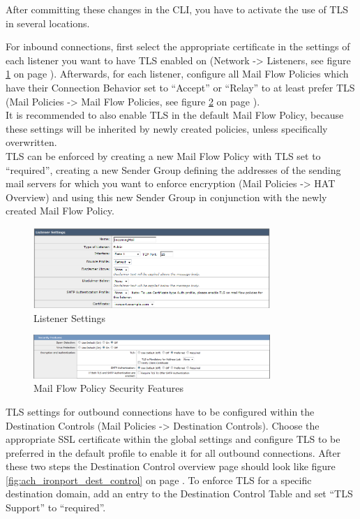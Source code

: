 After committing these changes in the CLI, you have to activate the use of TLS in several locations.

For inbound connections, first select the appropriate certificate in the settings of each listener you want to have TLS enabled on (Network -> Listeners, see figure \ref{fig:ach_ironport_listener_cert} on page \pageref{fig:ach_ironport_listener_cert}). Afterwards, for each listener, configure all Mail Flow Policies which have their Connection Behavior set to ``Accept'' or ``Relay'' to at least prefer TLS (Mail Policies -> Mail Flow Policies, see figure \ref{fig:ach_ironport_mail_flow_tls} on page \pageref{fig:ach_ironport_mail_flow_tls}). \\
It is recommended to also enable TLS in the default Mail Flow Policy, because these settings will be inherited by newly created policies, unless specifically overwritten. \\
TLS can be enforced by creating a new Mail Flow Policy with TLS set to ``required'', creating a new Sender Group defining the addresses of the sending mail servers for which you want to enforce encryption (Mail Policies -> HAT Overview) and using this new Sender Group in conjunction with the newly created Mail Flow Policy. 

\begin{figure}[p]
  \centering
  \includegraphics[width=0.8\textwidth]{img/ach_ironport_listener_cert.png}
  \caption{Listener Settings}
  \label{fig:ach_ironport_listener_cert}
\end{figure}

\begin{figure}[p]
  \centering
  \includegraphics[width=0.8\textwidth]{img/ach_ironport_mail_flow_tls.png}
  \caption{Mail Flow Policy Security Features}
  \label{fig:ach_ironport_mail_flow_tls}
\end{figure}

TLS settings for outbound connections have to be configured within the Destination Controls (Mail Policies -> Destination Controls). Choose the appropriate SSL certificate within the global settings and configure TLS to be preferred in the default profile to enable it for all outbound connections. After these two steps the Destination Control overview page should look like figure \ref{fig:ach_ironport_dest_control} on page \pageref{fig:ach_ironport_dest_control}. 
To enforce TLS for a specific destination domain, add an entry to the Destination Control Table and set ``TLS Support'' to ``required''.

